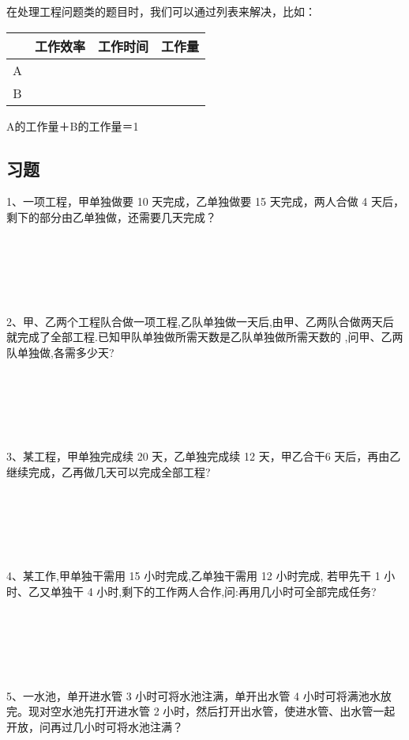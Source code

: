 \documentclass{article}
\begin{document}
在处理工程问题类的题目时，我们可以通过列表来解决，比如：

\begin{table}[htbp]
    \centering
    \begin{tabular}{|c|c|c|c|}
        \hline \ & 工作效率 & 工作时间 & 工作量 \\
        \hline A & \ & \ & \ \\
        \hline B & \ & \ & \ \\
        \hline
    \end{tabular}
\end{table}
\begin{center}
    A的工作量＋B的工作量＝1
\end{center}
\subsection{习题}
1、一项工程，甲单独做要 10 天完成，乙单独做要 15 天完成，两人合做 4 天后，剩下的部分由乙单独做，还需要几天完成？

~\\
~\\
~\\
~\\
~\\
2、甲、乙两个工程队合做一项工程,乙队单独做一天后,由甲、乙两队合做两天后就完成了全部工程.已知甲队单独做所需天数是乙队单独做所需天数的 ,问甲、乙两队单独做,各需多少天?

~\\
~\\
~\\
~\\
~\\
3、某工程，甲单独完成续 20 天，乙单独完成续 12 天，甲乙合干6 天后，再由乙继续完成，乙再做几天可以完成全部工程?

~\\
~\\
~\\
~\\
~\\
4、某工作,甲单独干需用 15 小时完成,乙单独干需用 12 小时完成, 若甲先干 1 小时、乙又单独干 4 小时,剩下的工作两人合作,问:再用几小时可全部完成任务?

~\\
~\\
~\\
~\\
~\\
5、一水池，单开进水管 3 小时可将水池注满，单开出水管 4 小时可将满池水放完。现对空水池先打开进水管 2 小时，然后打开出水管，使进水管、出水管一起开放，问再过几小时可将水池注满？
\end{document}
